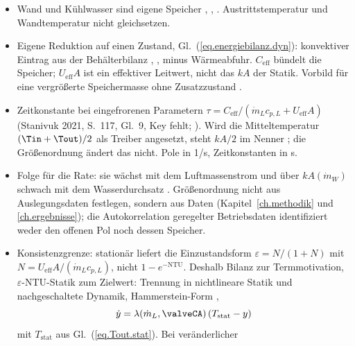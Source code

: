 \begin{itemize}
  \item Wand und Kühlwasser sind eigene Speicher
    \cite[S.~830--831, Gl.~31.35--31.38; S.~838--840, Gl.~31.57--31.65]{almbauerThermomanagement2019},
    \cite[Gl.~1 und 2]{yinAnalyticModelTransient2003},
    \cite[Gl.~2 und 27]{ariciVehicleEngineCooling1999}. Austrittstemperatur und
    Wandtemperatur nicht gleichsetzen.
  \item Eigene Reduktion auf einen Zustand, Gl.~(\ref{eq.energiebilanz.dyn}):
    konvektiver Eintrag aus der Behälterbilanz
    \cite[S.~31, Gl.~2.7]{guzzellaIntroductionModelingControl2010},
    \cite[S.~164, Gl.~7.26a]{erikssonModelingControlEngines2014},
    \cite[S.~147, Gl.~4.1.48]{isermannEngineModelingControl2014} minus
    Wärmeabfuhr. $C_{\mathrm{eff}}$ bündelt die Speicher; $U_{\mathrm{eff}}A$
    ist ein effektiver Leitwert, nicht das $kA$ der Statik. Vorbild für eine
    vergrößerte Speichermasse ohne Zusatzzustand
    \cite[S.~579, Gl.~26]{mrosekParameterEstimationPhysical2009}.
  \item Zeitkonstante bei eingefrorenen Parametern
    $\tau = C_{\mathrm{eff}}/(\dot m_L c_{p,L} + U_{\mathrm{eff}}A)$ (Stanivuk
    2021, S.~117, Gl.~9, Key fehlt;
    \cite[Gl.~31.36]{almbauerThermomanagement2019}). Wird die Mitteltemperatur
    $(\Tin + \Tout)/2$ als Treiber angesetzt, steht $kA/2$ im Nenner
    \cite[S.~230, Gl.~4.6.14--4.6.16]{isermannEngineModelingControl2014}; die
    Größenordnung ändert das nicht. Pole in 1/s, Zeitkonstanten in s.
  \item Folge für die Rate: sie wächst mit dem Luftmassenstrom und über
    $kA(\dot m_W)$ schwach mit dem Wasserdurchsatz
    \cite[S.~248, Gl.~4.7.39]{isermannEngineModelingControl2014}. Größenordnung
    nicht aus Auslegungsdaten festlegen, sondern aus Daten
    (Kapitel~\ref{ch.methodik} und \ref{ch.ergebnisse}); die Autokorrelation
    geregelter Betriebsdaten identifiziert weder den offenen Pol noch dessen
    Speicher.
  \item Konsistenzgrenze: stationär liefert die Einzustandsform
    $\varepsilon = N/(1+N)$ mit $N = U_{\mathrm{eff}}A/(\dot m_L c_{p,L})$, nicht
    $1 - e^{-\mathrm{NTU}}$. Deshalb Bilanz zur Termmotivation,
    $\varepsilon$-NTU-Statik zum Zielwert: Trennung in nichtlineare Statik und
    nachgeschaltete Dynamik, Hammerstein-Form
    \cite[Abschn.~2, Abb.~2, S.~4]{vagapovDynamicModelTemperature2022},
    \[
      \dot y = \lambda(\dot m_L, \valveCA)\,(T_{\mathrm{stat}} - y)
    \]
    mit $T_{\mathrm{stat}}$ aus Gl.~(\ref{eq.Tout.stat}). Bei veränderlicher

\end{itemize}
